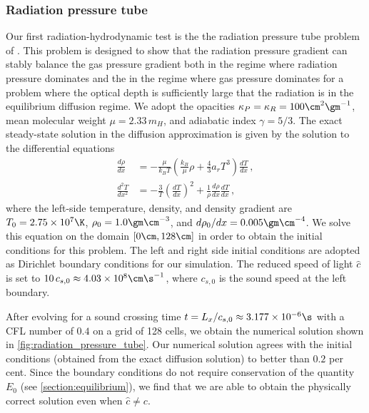 \documentclass[fleqn,usenatbib]{mnras}
\begin{document}
\subsubsection{Radiation pressure tube}
\label{section:radtube}
Our first radiation-hydrodynamic test is the the radiation pressure tube problem of \cite{Krumholz_2007}. This problem is designed to show that the radiation pressure gradient can stably balance the gas pressure gradient both in the regime where radiation pressure dominates and the in the regime where gas pressure dominates for a problem where the optical depth is sufficiently large that the radiation is in the equilibrium diffusion regime. We adopt the opacities $\kappa_P = \kappa_R = 100 \cm^2 \gm^{-1}$, mean molecular weight $\mu = 2.33 \, m_H$, and adiabatic index $\gamma = 5/3$. The exact steady-state solution in the diffusion approximation is given by the solution to the differential equations
\begin{align}
\frac{d \rho}{dx} &= -\frac{\mu}{k_B T} \left( \frac{k_B}{\mu} \rho + \frac{4}{3} a_r T^3 \right) \frac{dT}{dx} \, , \\
\frac{d^2 T}{dx^2} &= -\frac{3}{T} \left(\frac{dT}{dx}\right)^2 + \frac{1}{\rho} \frac{d\rho}{dx} \frac{dT}{dx} \, ,
\end{align}
where the left-side temperature, density, and density gradient are $T_0 = 2.75 \times 10^7 \K$, $\rho_0 = 1.0 \gm \cm^{-3}$, and ${d\rho_0}/{dx} = 0.005 \gm \cm^{-4}$. We solve this equation on the domain $[0 \cm, 128 \cm]$ in order to obtain the initial conditions for this problem. The left and right side initial conditions are adopted as Dirichlet boundary conditions for our simulation. The reduced speed of light $\hat c$ is set to $10 \, c_{s,0} \approx 4.03 \times 10^8 \cm \s^{-1}$, where $c_{s,0}$ is the sound speed at the left boundary.

After evolving for a sound crossing time $t = L_x / c_{s,0} \approx 3.177 \times 10^{-6} \s$ with a CFL number of $0.4$ on a grid of 128 cells, we obtain the numerical solution shown in \autoref{fig:radiation_pressure_tube}. Our numerical solution agrees with the initial conditions (obtained from the exact diffusion solution) to better than $0.2$ per cent. Since the boundary conditions do not require conservation of the quantity $E_0$ (see \autoref{section:equilibrium}), we find that we are able to obtain the physically correct solution even when $\hat c \neq c$.
\end{document}

